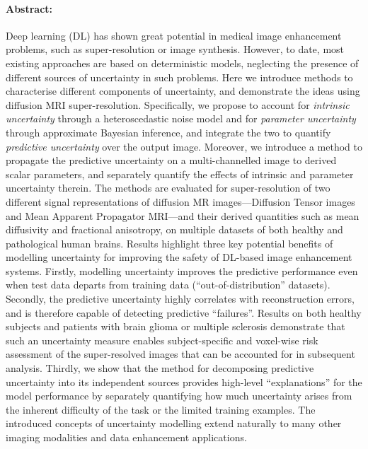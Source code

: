 \paragraph{Abstract: }
Deep learning (DL) has shown great potential in medical image enhancement problems, such as super-resolution or image synthesis. However, to date, most existing approaches are based on deterministic models, neglecting the presence of different sources of uncertainty in such problems. Here we introduce methods to characterise different components of uncertainty, and demonstrate the ideas using diffusion MRI super-resolution.  Specifically, we propose to account for \textit{intrinsic uncertainty} through a heteroscedastic noise model and for \textit{parameter uncertainty} through approximate Bayesian inference, and integrate the two to quantify \textit{predictive uncertainty} over the output image. Moreover, we introduce a method to propagate the predictive uncertainty on a multi-channelled image to derived scalar parameters, and separately quantify the effects of intrinsic and parameter uncertainty therein. The methods are evaluated for super-resolution of two different signal representations of diffusion MR images---Diffusion Tensor images and Mean Apparent Propagator MRI---and their derived quantities such as mean diffusivity and fractional anisotropy, on multiple datasets of both healthy and pathological human brains. Results highlight three key potential benefits of modelling uncertainty for improving the safety of DL-based image enhancement systems. Firstly, modelling uncertainty improves the predictive performance even when test data departs from training data (``out-of-distribution'' datasets). Secondly, the predictive uncertainty highly correlates with reconstruction errors, and is therefore capable of detecting predictive ``failures''. Results on both healthy subjects and patients with brain glioma or multiple sclerosis demonstrate that such an uncertainty measure enables subject-specific and voxel-wise risk assessment of the super-resolved images that can be accounted for in subsequent analysis. Thirdly, we show that the method for decomposing predictive uncertainty into its independent sources provides high-level ``explanations'' for the model performance by separately quantifying how much uncertainty arises from the inherent difficulty of the task or the limited training examples. The introduced concepts of uncertainty modelling extend naturally to many other imaging modalities and data enhancement applications.
